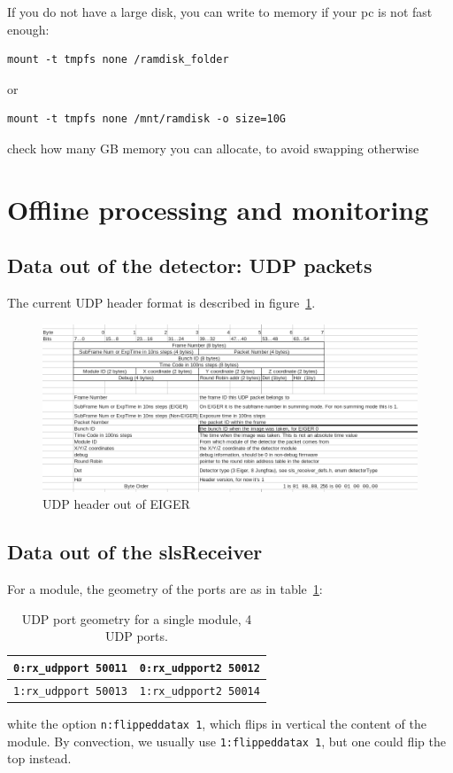 \documentclass{article}
\begin{document}
If you do not have a large disk, you can write to memory if your pc is not fast enough:
\begin{verbatim}
mount -t tmpfs none /ramdisk_folder
\end{verbatim}
or 
\begin{verbatim}
mount -t tmpfs none /mnt/ramdisk -o size=10G
\end{verbatim}
check how many GB memory you can allocate, to avoid swapping otherwise

\section{Offline processing and monitoring}

\subsection{Data out of the detector: UDP packets}\label{UDP}

The current UDP header format is described in figure~\ref{UDPheader}.
\begin{figure}[t]
\begin{center}
\includegraphics[width=1.2\textwidth]{EIGERUDPHeader}
\end{center}
\caption{UDP header out of EIGER}
\label{UDPheader}
\end{figure}
 
\subsection{Data out of the slsReceiver}


For a module, the geometry of the ports are as in table~\ref{tports}: 
\begin{table}
\begin{tabular}{|c|c|}
\hline
{\tt{0:rx\_udpport 50011}} &  {\tt{0:rx\_udpport2 50012}}\\  
\hline
{\tt{1:rx\_udpport 50013}} &  {\tt{1:rx\_udpport2 50014}}\\  
\hline
\end{tabular}
\caption{UDP port geometry for a single module, 4 UDP ports.}
\label{tports}
\end{table}
white the option {\tt{n:flippeddatax 1}}, which flips in vertical the content of the module. By convection, we usually use {\tt{1:flippeddatax 1}}, but one could flip the top instead.
\end{document}
